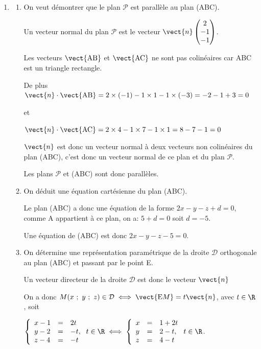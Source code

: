 \begin{enumerate}
\begin{enumerate}
La calculatrice donne $\widehat{\text{ABC}} \approx 68\degres$ au degré près.
	\end{enumerate}
	
\item
	\begin{enumerate}
		\item On veut démontrer que le plan $\mathcal{P}$ est parallèle au plan (ABC).

Un vecteur normal du plan $\mathscr{P}$ est le vecteur $\vect{n}\begin{pmatrix}2\\-1\\-1\end{pmatrix}$.

Les vecteurs $\vect{\text{AB}}$ et $\vect{\text{AC}}$ ne sont pas colinéaires car ABC est un triangle rectangle.

De plus $\vect{n} \cdot \vect{\text{AB}}=2\times (-1) -1\times 1 - 1\times (-3) =-2-1+3 = 0$

et

$\vect{n} \cdot \vect{\text{AC}}=2\times 4-1\times 7-1\times 1 = 8 - 7 - 1 = 0$

$\vect{n}$ est donc un vecteur normal à deux vecteurs non colinéaires du plan (ABC), c'est donc un vecteur normal de ce plan et du plan $\mathscr{P}$.

Les plans $\mathscr{P}$ et (ABC) sont donc parallèles.

		\item On déduit une équation cartésienne du plan (ABC).

Le plan (ABC) a donc une équation de la forme $2x - y - z + d = 0$, comme A appartient à ce plan,  on a: $5 + d = 0$ soit $d = -5$.
		
Une équation de (ABC) est donc $2x - y - z - 5 = 0$.

		\item On détermine une représentation paramétrique de la droite $\mathcal{D}$ orthogonale au plan (ABC) et passant par le point E.
		
Un vecteur directeur de la droite $\mathcal{D}$ est donc le vecteur $\vect{n}$ 
		

On a donc $M(x~;~y~;~z) \in \mathcal{D} \iff \vect{\text{E}M} = t \vect{n}$, avec $t \in \R$, soit

$\left\{\begin{array}{l c l}
x - 1&=&2t\\
y - 2&=&- t,\\
z - 4&=&-t
\end{array}\right. t \in \R \iff \left\{\begin{array}{l c l}
x &=& 1 +2t\\
y &=& 2 - t,\\
z &=&4 -t
\end{array}\right. t \in \R$.


\end{enumerate}
\end{enumerate}
